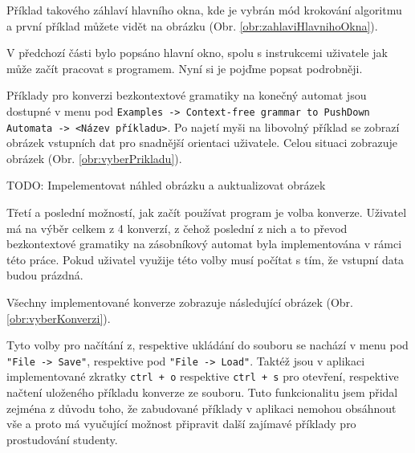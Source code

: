 Příklad takového záhlaví hlavního okna, kde je vybrán mód krokování algoritmu a první příklad můžete vidět na obrázku (Obr. \ref{obr:zahlaviHlavnihoOkna}).



V předchozí části bylo popsáno hlavní okno, spolu s instrukcemi uživatele jak může začít pracovat s programem. Nyní si je pojďme popsat podrobněji.



Příklady pro konverzi bezkontextové gramatiky na konečný automat jsou dostupné v menu pod \texttt{Examples -> Context-free grammar to PushDown Automata -> <Název příkladu>}. Po najetí myši na libovolný příklad se zobrazí obrázek vstupních dat pro snadnější orientaci uživatele. Celou situaci zobrazuje obrázek (Obr. \ref{obr:vyberPrikladu}).

TODO: Impelementovat náhled obrázku a auktualizovat obrázek



Třetí a poslední možností, jak začít používat program je volba konverze. Uživatel má na výběr celkem z 4 konverzí, z čehož poslední z nich a to převod bezkontextové gramatiky na zásobníkový automat byla implementována v rámci této práce. Pokud uživatel využije této volby musí počítat s tím, že vstupní data budou prázdná.

Všechny implementované konverze zobrazuje následující obrázek (Obr. \ref{obr:vyberKonverzi}).




Tyto volby pro načítání z, respektive ukládání do souboru se nachází v menu pod \texttt{"File -> Save"}, respektive pod \texttt{"File -> Load"}. Taktéž jsou v aplikaci implementované zkratky \texttt{ctrl + o} respektive \texttt{ctrl + s} pro otevření, respektive načtení uloženého příkladu konverze ze souboru. Tuto funkcionalitu jsem přidal zejména z důvodu toho, že zabudované příklady v aplikaci nemohou obsáhnout vše a proto má vyučující možnost připravit další zajímavé příklady pro prostudování studenty.  

